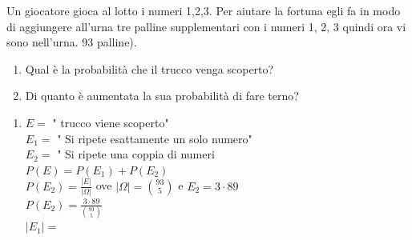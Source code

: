 \documentclass[12pt]{report}
\newcounter{exercise}
\begin{document}
  	 	\begin{exercise}{}{}
  	 		\begin{assignment}{}{}
  	 			Un giocatore gioca al lotto i numeri 1,2,3. Per aiutare la fortuna egli fa
  	 			in modo di aggiungere all'urna tre palline supplementari con i numeri 1, 2, 3
  	 			quindi ora vi sono nell'urna. 93 palline).
  	 			\begin{enumerate}
  	 				\item Qual è la probabilità che il trucco venga scoperto?
  	 				\item Di quanto è aumentata la sua probabilità di fare terno?
  	 			\end{enumerate}
  	 		\end{assignment}
  	 		\begin{enumerate}
  	 			\item $E = $ " trucco viene scoperto" \\
  	 			$E_1 =$ " Si ripete esattamente un solo numero" \\
  	 			$E_2 = $ " Si ripete una coppia di numeri \\
  	 			$P(E) = P(E_1) + P(E_2)$ \\
  	 			$P(E_2) = \frac{|E|}{|\Omega|}$ ove $|\Omega| = \binom{93}{5}$ e $E_2 = 3 \cdot 89$ \\
  	 			$P(E_2) = \frac{3 \cdot 89}{\binom{93}{5}}$ \\
  	 			$|E_1| = $
  	 		\end{enumerate}
  	 	\end{exercise}
\end{document}
